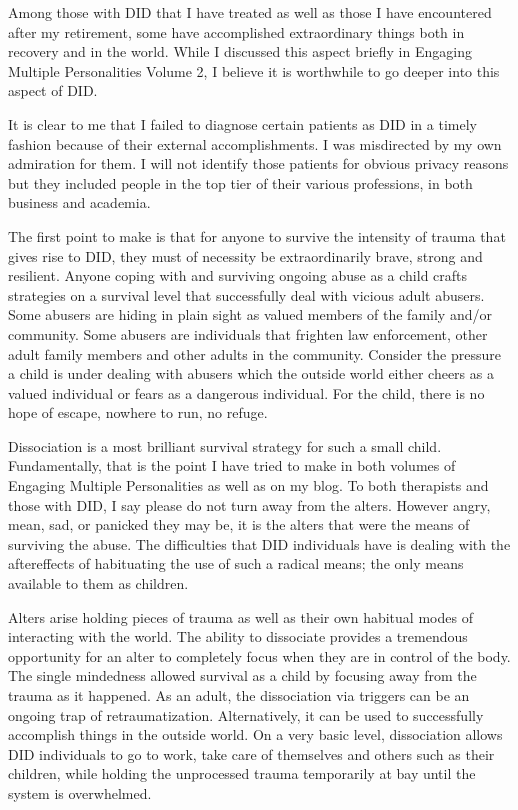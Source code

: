 \documentclass[]{book}
\begin{document}
Among those with DID that I have treated as well as those I have encountered after my retirement, some have accomplished extraordinary things both in recovery and in the world. While I discussed this aspect briefly in Engaging Multiple Personalities Volume 2, I believe it is worthwhile to go deeper into this aspect of DID.

It is clear to me that I failed to diagnose certain patients as DID in a timely fashion because of their external accomplishments. I was misdirected by my own admiration for them. I will not identify those patients for obvious privacy reasons but they included people in the top tier of their various professions, in both business and academia.

The first point to make is that for anyone to survive the intensity of trauma that gives rise to DID, they must of necessity be extraordinarily brave, strong and resilient. Anyone coping with and surviving ongoing abuse as a child crafts strategies on a survival level that successfully deal with vicious adult abusers. Some abusers are hiding in plain sight as valued members of the family and/or community. Some abusers are individuals that frighten law enforcement, other adult family members and other adults in the community. Consider the pressure a child is under dealing with abusers which the outside world either cheers as a valued individual or fears as a dangerous individual. For the child, there is no hope of escape, nowhere to run, no refuge.

Dissociation is a most brilliant survival strategy for such a small child. Fundamentally, that is the point I have tried to make in both volumes of Engaging Multiple Personalities as well as on my blog. To both therapists and those with DID, I say please do not turn away from the alters. However angry, mean, sad, or panicked they may be, it is the alters that were the means of surviving the abuse. The difficulties that DID individuals have is dealing with the aftereffects of habituating the use of such a radical means; the only means available to them as children.

Alters arise holding pieces of trauma as well as their own habitual modes of interacting with the world. The ability to dissociate provides a tremendous opportunity for an alter to completely focus when they are in control of the body. The single mindedness allowed survival as a child by focusing away from the trauma as it happened. As an adult, the dissociation via triggers can be an ongoing trap of retraumatization. Alternatively, it can be used to successfully accomplish things in the outside world. On a very basic level, dissociation allows DID individuals to go to work, take care of themselves and others such as their children, while holding the unprocessed trauma temporarily at bay until the system is overwhelmed.
\end{document}
